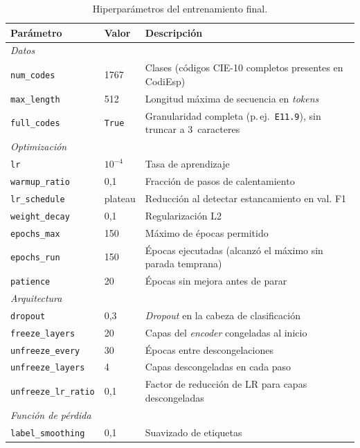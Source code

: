 \begin{table}[h]
\centering
\caption{Hiperparámetros del entrenamiento final.}
\label{tab:hyperparams}
\begin{tabular}{lll}
\hline
\textbf{Parámetro} & \textbf{Valor} & \textbf{Descripción} \\
\hline
\multicolumn{3}{l}{\textit{Datos}} \\
\texttt{num\_codes}      & 1767          & Clases (códigos CIE-10 completos presentes en CodiEsp) \\
\texttt{max\_length}     & 512           & Longitud máxima de secuencia en \emph{tokens} \\
\texttt{full\_codes}     & \texttt{True} & Granularidad completa (p.\,ej.\ \texttt{E11.9}), sin truncar a 3~caracteres \\
\hline
\multicolumn{3}{l}{\textit{Optimización}} \\
\texttt{lr}              & $10^{-4}$     & Tasa de aprendizaje \\
\texttt{warmup\_ratio}   & 0{,}1         & Fracción de pasos de calentamiento \\
\texttt{lr\_schedule}    & plateau       & Reducción al detectar estancamiento en val. F1 \\
\texttt{weight\_decay}   & 0{,}1         & Regularización L2 \\
\texttt{epochs\_max}     & 150           & Máximo de épocas permitido \\
\texttt{epochs\_run}     & 150           & Épocas ejecutadas (alcanzó el máximo sin parada temprana) \\
\texttt{patience}        & 20            & Épocas sin mejora antes de parar \\
\hline
\multicolumn{3}{l}{\textit{Arquitectura}} \\
\texttt{dropout}         & 0{,}3         & \emph{Dropout} en la cabeza de clasificación \\
\texttt{freeze\_layers}  & 20            & Capas del \emph{encoder} congeladas al inicio \\
\texttt{unfreeze\_every} & 30            & Épocas entre descongelaciones \\
\texttt{unfreeze\_layers}& 4             & Capas descongeladas en cada paso \\
\texttt{unfreeze\_lr\_ratio} & 0{,}1     & Factor de reducción de LR para capas descongeladas \\
\hline
\multicolumn{3}{l}{\textit{Función de pérdida}} \\
\texttt{label\_smoothing} & 0{,}1       & Suavizado de etiquetas \\

\end{tabular}
\end{table}
